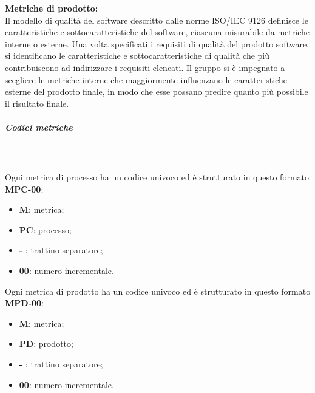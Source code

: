 \textbf{Metriche di prodotto:}\\
Il modello di qualità del software descritto dalle norme ISO/IEC 9126 definisce le caratteristiche e sottocaratteristiche del software, ciascuna misurabile da metriche interne o esterne.
Una volta specificati i requisiti di qualità del prodotto software, si identificano le caratteristiche e sottocaratteristiche di qualità che più contribuiscono ad indirizzare i requisiti elencati.
Il gruppo \Gruppo{} si è impegnato a scegliere le metriche interne che maggiormente influenzano le caratteristiche esterne del prodotto finale, in modo che esse possano predire quanto più possibile il risultato finale.

\subparagraph{Codici metriche}\mbox{} \\ \\
Ogni metrica di processo ha un codice univoco ed è strutturato in questo formato \textbf{MPC-00}:
\begin{itemize}
    \item \textbf{M}: metrica;
    \item \textbf{PC}: processo;
    \item \textbf{-} : trattino separatore;
    \item \textbf{00}: numero incrementale.
\end{itemize}
Ogni metrica di prodotto ha un codice univoco ed è strutturato in questo formato \textbf{MPD-00}:
\begin{itemize}
    \item \textbf{M}: metrica;
    \item \textbf{PD}: prodotto;
    \item \textbf{-} : trattino separatore;
    \item \textbf{00}: numero incrementale.
\end{itemize}

